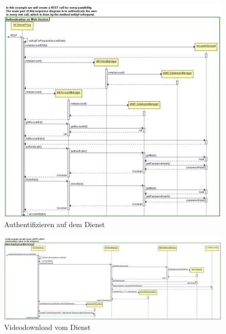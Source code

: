 \begin{figure}[ht]
	\centering
\includegraphics[width=1\textwidth]{./resources/Diagramme/Webservice/SeqAuthenticate.jpg}
\caption{Authentifizieren auf dem Dienst}
	\label{fig:ServiceAuth}
\end{figure}

\begin{figure}[ht]
	\centering
\includegraphics[width=1\textwidth]{./resources/Diagramme/Webservice/SeqVideoDownload.jpg}
\caption{Videodownload vom Dienst}
	\label{fig:ServiceDownl}
\end{figure}

